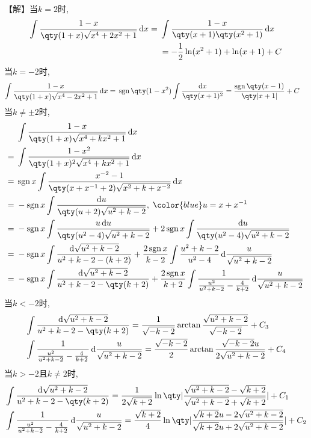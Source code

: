 \documentclass{ctexbook}
\DeclareMathOperator{\sgn}{sgn}
\newcommand*{\dif}{\mathop{}\!\mathrm{d}}
\begin{document}
{【解】当$k=2$时, 
\begin{align*}
\int\frac{1-x}{\qty(1+x)\sqrt{x^{4}+2x^{2}+1}}\dif{x}={}&\int\frac{1-x}{\qty(x+1)\qty(x^{2}+1)}\dif{x}\\
{}&=-\frac{1}{2}\ln(x^{2}+1)+\ln(x+1)+C
\end{align*}
当$k=-2$时, 
\begin{align*}
\int\frac{1-x}{\qty(1+x)\sqrt{x^{4}-2x^{2}+1}}\dif{x}={}&\sgn{\qty(1-x^{2})}\int\frac{\dif{x}}{\qty(x+1)^{2}}=\frac{\sgn{\qty(x-1)}}{\qty|x+1|}+C
\end{align*}
当$k\ne\pm2$时, 
\begin{align*}
{}&\int\frac{1-x}{\qty(1+x)\sqrt{x^{4}+kx^{2}+1}}\dif{x}\\
={}&\int\frac{1-x^{2}}{\qty(1+x)^{2}\sqrt{x^{4}+kx^{2}+1}}\dif{x}\\
={}&\sgn{x}\int\frac{x^{-2}-1}{\qty(x+x^{-1}+2)\sqrt{x^{2}+k+x^{-2}}}\dif{x}\\
={}&-\sgn{x}\int\frac{\dif{u}}{\qty(u+2)\sqrt{u^{2}+k-2}},\;{\color{blue}u=x+x^{-1}}\\
={}&-\sgn{x}\int\frac{u\dif{u}}{\qty(u^{2}-4)\sqrt{u^{2}+k-2}}+2\sgn{x}\int\frac{\dif{u}}{\qty(u^{2}-4)\sqrt{u^{2}+k-2}}\\
={}&-\sgn{x}\int\frac{\dif{\sqrt{u^{2}+k-2}}}{u^{2}+k-2-(k+2)}+\frac{2\sgn{x}}{k-2}\int\frac{u^{2}+k-2}{u^{2}-4}\dif{\frac{u}{\sqrt{u^{2}+k-2}}}\\
={}&-\sgn{x}\int\frac{\dif{\sqrt{u^{2}+k-2}}}{u^{2}+k-2-\qty(k+2)}+\frac{2\sgn{x}}{k+2}\int\frac{1}{\frac{u^{2}}{u^{2}+k-2}-\frac{4}{k+2}}\dif{\frac{u}{\sqrt{u^{2}+k-2}}}
\end{align*}
当$k<-2$时, 
\begin{align*}
{}&\int\frac{\dif{\sqrt{u^{2}+k-2}}}{u^{2}+k-2-\qty(k+2)}=\frac{1}{\sqrt{-k-2}}\arctan{\frac{\sqrt{u^{2}+k-2}}{\sqrt{-k-2}}}+C_{3}\\
{}&\int\frac{1}{\frac{u^{2}}{u^{2}+k-2}-\frac{4}{k+2}}\dif{\frac{u}{\sqrt{u^{2}+k-2}}}=\frac{\sqrt{-k-2}}{2}\arctan{\frac{\sqrt{-k-2}u}{2\sqrt{u^{2}+k-2}}}+C_{4}
\end{align*}
当$k>-2$且$k\ne2$时, 
\begin{align*}
{}&\int\frac{\dif{\sqrt{u^{2}+k-2}}}{u^{2}+k-2-\qty(k+2)}=\frac{1}{2\sqrt{k+2}}\ln\qty|\frac{\sqrt{u^{2}+k-2}-\sqrt{k+2}}{\sqrt{u^{2}+k-2}+\sqrt{k+2}}|+C_{1}\\
{}&\int\frac{1}{\frac{u^{2}}{u^{2}+k-2}-\frac{4}{k+2}}\dif{\frac{u}{\sqrt{u^{2}+k-2}}}=\frac{\sqrt{k+2}}{4}\ln\qty|\frac{\sqrt{k+2}u-2\sqrt{u^{2}+k-2}}{\sqrt{k+2}u+2\sqrt{u^{2}+k-2}}|+C_{2}

\end{align*}}
\end{document}
